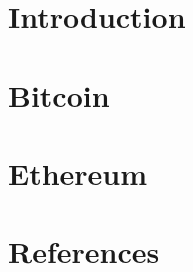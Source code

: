 \section[Intro]{Introduction}


\section[BTC]{Bitcoin}


\section[ETH]{Ethereum}


\section[Refs]{References}


